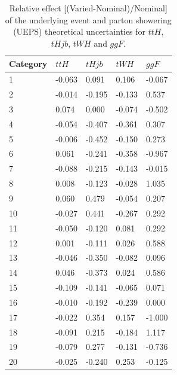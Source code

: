 \begin{table}[ht]
\begin{center}
\begin{tabular}{lllll}
Category & $ttH$ & $tHjb$ & $tWH$ & $ggF$ \\ \hline
1  &       -0.063 &         0.091 &        0.106 &    -0.067 \\
2  &       -0.014 &        -0.195 &       -0.133 &     0.537 \\
3  &        0.074 &         0.000 &       -0.074 &    -0.502 \\
4  &       -0.054 &        -0.407 &       -0.361 &     0.307 \\
5  &       -0.006 &        -0.452 &       -0.150 &     0.273 \\
6  &        0.061 &        -0.241 &       -0.358 &    -0.967 \\
7  &       -0.088 &        -0.215 &       -0.143 &    -0.015 \\
8  &        0.008 &        -0.123 &       -0.028 &     1.035 \\
9  &        0.060 &         0.479 &       -0.054 &     0.207 \\
10 &       -0.027 &         0.441 &       -0.267 &     0.292 \\
11 &       -0.050 &        -0.120 &        0.081 &     0.292 \\
12 &        0.001 &        -0.111 &        0.026 &     0.588 \\ \hline
13 &       -0.046 &        -0.350 &       -0.082 &     0.096 \\
14 &        0.046 &        -0.373 &        0.024 &     0.586 \\
15 &       -0.109 &        -0.141 &       -0.065 &     0.071 \\
16 &       -0.010 &        -0.192 &       -0.239 &     0.000 \\
17 &       -0.022 &         0.354 &        0.157 &    -1.000 \\
18 &       -0.091 &         0.215 &       -0.184 &     1.117 \\
19 &       -0.079 &         0.277 &       -0.131 &    -0.736 \\
20 &       -0.025 &        -0.240 &        0.253 &    -0.125 \\ \hline
\hline
\end{tabular}
\end{center}
\vspace{-0.5cm}
\caption{Relative effect [(Varied-Nominal)/Nominal] of the underlying event and parton showering (UEPS) theoretical uncertainties for $ttH$, $tHjb$, $tWH$ and $ggF$.}
\label{tab:ueps}
\end{table}

